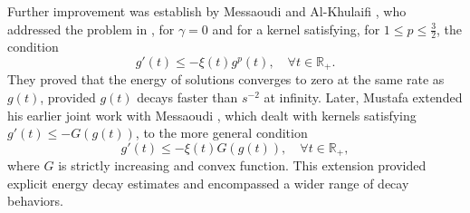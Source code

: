 \documentclass[10pt,a4paper]{amsart}
\numberwithin{equation}{section}
\begin{document}
Further improvement was establish by Messaoudi and Al-Khulaifi \cite{MessaoudiWaled}, who addressed the problem in \cite{CavalcantiDS}, for $\gamma =0$ and for a kernel satisfying, for $1\leq p\leq \frac{3}{2}$, the condition
\[
g'(t) \leq -\xi(t) g^p(t), \quad \forall t \in \mathbb{R}_{+}.
\]
They proved that the energy of solutions converges to zero at the same rate as $g(t)$, provided $g(t)$ decays faster than $s^{-2}$ at infinity. Later, Mustafa \cite{MM181} extended his earlier joint work with Messaoudi \cite{MM}, which dealt with kernels satisfying $g'(t) \leq -G(g(t))$, to the more general condition $$g'(t) \leq -\xi(t) G(g(t)), \quad \forall t \in \mathbb{R}_{+},$$ where $G$ is strictly increasing and convex function. This extension provided explicit energy decay estimates and encompassed a wider range of decay behaviors.
\end{document}
